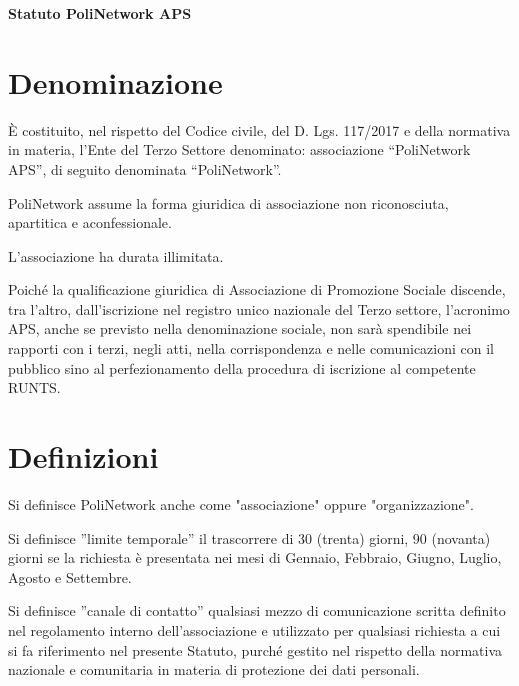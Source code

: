 \documentclass[legalpaper, 11pt]{exam}
\let\tempone\enumerate
\let\temptwo\endenumerate
\renewenvironment{enumerate}{\tempone\addtolength{\itemsep}{-0.45\baselineskip}}{\temptwo}
\begin{document}

{

\begin{center}


\begin{center}
{\textbf{Statuto PoliNetwork APS}}

\end{center}



\end{center}


\section{Denominazione}
\begin{enumerate}
 \item È costituito, nel rispetto del Codice civile, del D. Lgs. 117/2017 e della normativa in materia, l’Ente del Terzo Settore denominato: associazione “PoliNetwork APS”, di seguito denominata “PoliNetwork”.
 \item PoliNetwork assume la forma giuridica di associazione non riconosciuta, apartitica e aconfessionale.
 \item L'associazione ha durata illimitata.
 \item Poiché la qualificazione giuridica di Associazione di Promozione Sociale discende, tra l'altro, dall'iscrizione nel registro unico nazionale del Terzo settore, l'acronimo APS, anche se previsto nella denominazione sociale, non sarà spendibile nei rapporti con i terzi, negli atti, nella corrispondenza e nelle comunicazioni con il pubblico sino al perfezionamento della procedura di iscrizione al competente RUNTS.
\end{enumerate}

\section{Definizioni}
\begin{enumerate}
 \item Si definisce PoliNetwork anche come "associazione" oppure "organizzazione".
 \item Si definisce ”limite temporale” il trascorrere di 30 (trenta) giorni, 90 (novanta) giorni se la richiesta è presentata nei mesi di Gennaio, Febbraio, Giugno, Luglio, Agosto e Settembre.
 \item Si definisce ”canale di contatto” qualsiasi mezzo di comunicazione scritta definito nel regolamento interno dell’associazione e utilizzato per qualsiasi richiesta a cui si fa riferimento nel presente Statuto, purché gestito nel rispetto della normativa nazionale e comunitaria in materia di protezione dei dati personali.
\end{enumerate}

}
\end{document}
